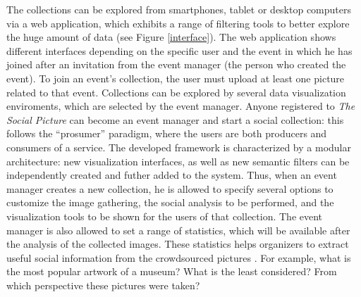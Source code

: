 The collections can be explored from smartphones, tablet or desktop computers via a web application, which exhibits a range of filtering tools to better explore the huge amount of data (see Figure \ref{interface}).
The web application shows different interfaces depending on the specific user and the event in which he has joined after an invitation from the event manager (the person who created the event). To join an event's collection, the user must upload at least one picture related to that event. Collections can be explored by several data visualization enviroments, which are selected by the event manager. Anyone registered to \textit{The Social Picture} can become an event manager and start a social collection: this follows the ``prosumer'' paradigm, where the users are both producers and consumers of a service.
The developed framework is characterized by a modular architecture: new visualization interfaces, as well as new semantic filters can be independently created and futher added to the system.
Thus, when an event manager creates a new collection, he is allowed to specify several options to customize the image gathering, the social analysis to be performed, and the visualization tools to be shown for the users of that collection.
The event manager is also allowed to set a range of statistics, which will be available after the analysis of the collected images. These statistics helps organizers to extract useful social information from the crowdsourced pictures \cite{Milotta2016n544}. For example, what is the most popular artwork of a museum? What is the least considered? From which perspective these pictures were taken?
